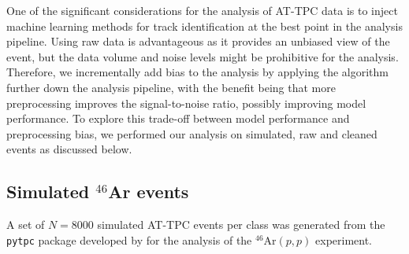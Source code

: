 \documentclass[review,sort&compress]{elsarticle}
\begin{document}
One of the significant considerations for the analysis of AT-TPC data is to inject machine learning methods for track identification at the best point in the analysis pipeline.
Using raw data is advantageous as it provides an unbiased view of the event, but the data volume and noise levels might be prohibitive for the analysis.
Therefore, we incrementally add bias to the analysis by applying the algorithm further down the analysis pipeline, with the benefit being that more preprocessing improves the signal-to-noise ratio, possibly improving model performance.
To explore this trade-off between model performance and preprocessing bias, we performed our analysis on simulated, raw and cleaned events as discussed below.




\subsection{Simulated \texorpdfstring{${}^{46}$Ar}{46Ar} events}\label{sec:data_sim}

A set of $N=8000$ simulated AT-TPC events per class was generated from the \texttt{pytpc} package developed by \citet{Bradt2017a} for the analysis of the  ${}^{46}$Ar$(p, p)$ experiment.
\end{document}

